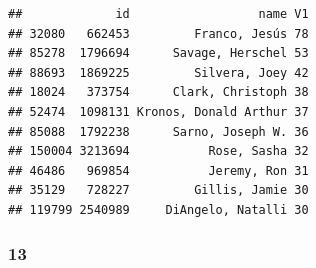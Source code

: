 \documentclass[]{article}
\newenvironment{Shaded}{\begin{snugshade}}{\end{snugshade}}
\newcommand{\KeywordTok}[1]{\textcolor[rgb]{0.13,0.29,0.53}{\textbf{{#1}}}}
\newcommand{\DataTypeTok}[1]{\textcolor[rgb]{0.13,0.29,0.53}{{#1}}}
\newcommand{\DecValTok}[1]{\textcolor[rgb]{0.00,0.00,0.81}{{#1}}}
\newcommand{\StringTok}[1]{\textcolor[rgb]{0.31,0.60,0.02}{{#1}}}
\newcommand{\CommentTok}[1]{\textcolor[rgb]{0.56,0.35,0.01}{\textit{{#1}}}}
\newcommand{\NormalTok}[1]{{#1}}
\begin{document}
\begin{Shaded}
\end{Shaded}

\begin{verbatim}
##             id                  name V1
## 32080   662453         Franco, Jesús 78
## 85278  1796694      Savage, Herschel 53
## 88693  1869225         Silvera, Joey 42
## 18024   373754      Clark, Christoph 38
## 52474  1098131 Kronos, Donald Arthur 37
## 85088  1792238      Sarno, Joseph W. 36
## 150004 3213694           Rose, Sasha 32
## 46486   969854           Jeremy, Ron 31
## 35129   728227         Gillis, Jamie 30
## 119799 2540989     DiAngelo, Natalli 30
\end{verbatim}

\subsubsection{13}\label{section}
\end{document}
